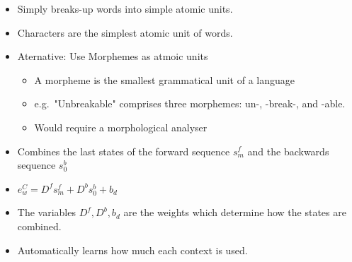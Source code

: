 \documentclass[11pt, a4paper, landscape]{article}
\begin{document}
\NewPage{}

\begin{itemize}
\item Simply breaks-up words into simple atomic units.
\item Characters are the simplest atomic unit of words.
\item Aternative: Use Morphemes as atmoic units
  \begin{itemize}
  \item A morpheme is the smallest grammatical unit of a language
  \item e.g.\ "Unbreakable" comprises three morphemes: un-, -break-, and -able.
  \item Would require a morphological analyser
  \end{itemize}
\end{itemize}
\vfill


\NewPage{}

\vfill
\begin{itemize}
\item Combines the last states of the forward sequence $s_{m}^f$ and the backwards sequence $s_{0}^b$
\item $e_{w}^C = D^f s_{m}^f + D^b s_{0}^b + b_d$
\item The variables $D^f, D^b, b_d$ are the weights which determine how the states are combined.
\item Automatically learns how much each context is used.
\end{itemize}
\vfill


\NewPage{}
\end{document}
